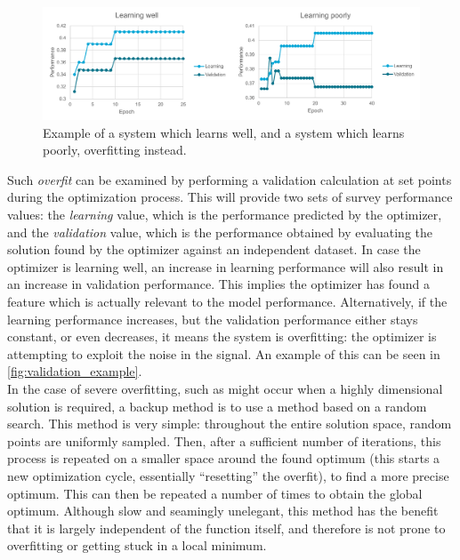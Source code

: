 \begin{figure}[htbp]
 \centering
 \includegraphics[width=1.0\textwidth]{img/validation_example.pdf}
 \caption{Example of a system which learns well, and a system which learns poorly, overfitting instead.}
 \label{fig:validation_example}
\end{figure}

Such \textit{overfit} can be examined by performing a validation calculation at set points during the optimization process. This will provide two sets of survey performance values: the \textit{learning} value, which is the performance predicted by the optimizer, and the \textit{validation} value, which is the performance obtained by evaluating the solution found by the optimizer against an independent dataset. In case the optimizer is learning well, an increase in learning performance will also result in an increase in validation performance. This implies the optimizer has found a feature which is actually relevant to the model performance. Alternatively, if the learning performance increases, but the validation performance either stays constant, or even decreases, it means the system is overfitting: the optimizer is attempting to exploit the noise in the signal. An example of this can be seen in \autoref{fig:validation_example}.\\


In the case of severe overfitting, such as might occur when a highly dimensional solution is required, a backup method is to use a method based on a random search. This method is very simple: throughout the entire solution space, random points are uniformly sampled. Then, after a sufficient number of iterations, this process is repeated on a smaller space around the found optimum (this starts a new optimization cycle, essentially ``resetting'' the overfit), to find a more precise optimum. This can then be repeated a number of times to obtain the global optimum. Although slow and seamingly unelegant, this method has the benefit that it is largely independent of the function itself, and therefore is not prone to overfitting or getting stuck in a local minimum.

